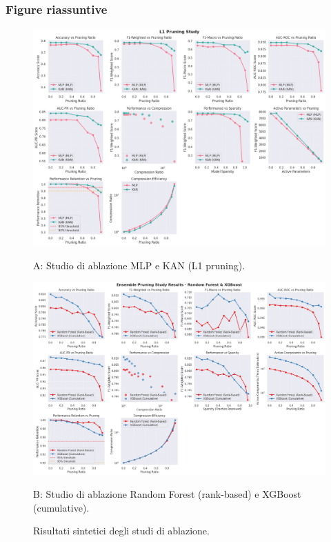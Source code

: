 \documentclass[a4paper,12pt]{report}
\begin{document}
	\subsubsection{Figure riassuntive}
	\begin{figure}[H]
		\centering
		\begin{minipage}{0.49\textwidth}
			\centering
			\includegraphics[width=\linewidth]{img/abl_kanvsmlp_pm.png}
			\caption*{A: Studio di ablazione MLP e KAN (L1 pruning).}
		\end{minipage}\hfill
		\begin{minipage}{0.49\textwidth}
			\centering
			\includegraphics[width=\linewidth]{img/abl_xgbvsrf_pm.png}
			\caption*{B: Studio di ablazione Random Forest (rank-based) e XGBoost (cumulative).}
		\end{minipage}
		\caption{Risultati sintetici degli studi di ablazione.}
	\end{figure}
	
\end{document}
